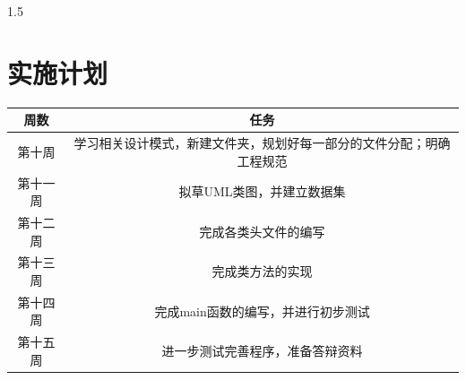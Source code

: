 \documentclass[a4paper]{article}
\begin{document}
\begin{spacing}{1.5}
\section{实施计划}
\begin{tabular}{c|c}
    \hline
    周数 & 任务 \\ \hline
    第十周 & 学习相关设计模式，新建文件夹，规划好每一部分的文件分配；明确工程规范 \\ \hline
    第十一周 & 拟草UML类图，并建立数据集 \\ \hline
    第十二周 & 完成各类头文件的编写 \\ \hline
    第十三周 & 完成类方法的实现 \\ \hline
    第十四周 & 完成main函数的编写，并进行初步测试 \\ \hline
    第十五周 & 进一步测试完善程序，准备答辩资料 \\ \hline
\end{tabular}

\end{spacing}
\end{document}
